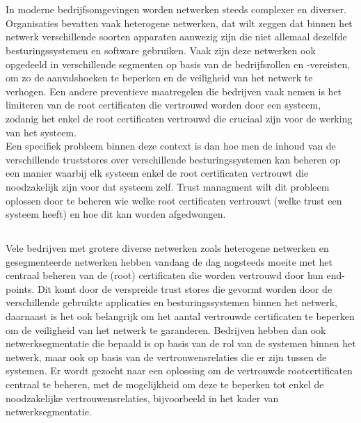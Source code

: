 
\chapter{}%
\label{ch:inleiding}

In moderne bedrijfsomgevingen worden netwerken steeds complexer en diverser. Organisaties bevatten vaak heterogene netwerken, dat wilt zeggen dat binnen het netwerk verschillende soorten apparaten aanwezig zijn die niet allemaal dezelfde besturingssystemen en software gebruiken. 
Vaak zijn deze netwerken ook opgedeeld in verschillende segmenten op basis van de bedrijfsrollen en -vereisten, om zo de aanvalshoeken te beperken en de veiligheid van het netwerk te verhogen.
Een andere preventieve maatregelen die bedrijven vaak nemen is het limiteren van de root certificaten die vertrouwd worden door een systeem, zodanig het enkel de root certificaten vertrouwd die cruciaal zijn voor de werking van het systeem. \\

Een specifiek probleem binnen deze context is dan hoe men de inhoud van de verschillende truststores over verschillende besturingssystemen kan beheren op een manier waarbij elk systeem enkel de root certificaten vertrouwt die noodzakelijk zijn voor dat systeem zelf. 
Trust managment wilt dit probleem oplossen door te beheren wie welke root certificaten vertrouwt (welke trust een systeem heeft) en hoe dit kan worden afgedwongen.

\section{}%
\label{sec:probleemstelling}

Vele bedrijven met grotere diverse netwerken zoals heterogene netwerken en gesegmenteerde netwerken hebben vandaag de dag nogsteeds moeite met het centraal beheren van de (root) certificaten die worden vertrouwd door hun end-points. 
Dit komt door de verspreide trust stores die gevormt worden door de verschillende gebruikte applicaties en besturingssystemen binnen het netwerk, daarnaast is het ook belangrijk om het aantal vertrouwde certificaten te beperken om de veiligheid van het netwerk te garanderen.
Bedrijven hebben dan ook netwerksegmentatie die bepaald is op basis van de rol van de systemen binnen het netwerk, maar ook op basis van de vertrouwensrelaties die er zijn tussen de systemen.
Er wordt gezocht naar een oplossing om de vertrouwde rootcertificaten centraal te beheren, met de mogelijkheid om deze te beperken tot enkel de noodzakelijke vertrouwensrelaties, bijvoorbeeld in het kader van netwerksegmentatie.

